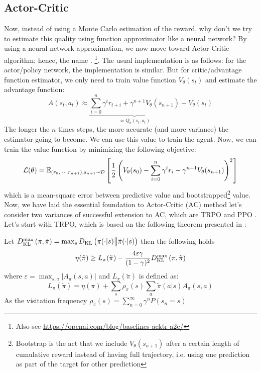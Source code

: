 \subsection{Actor-Critic}
\label{sec:chap2-ator-critic}
Now, instead of using a Monte Carlo estimation of the reward, why don't we try to estimate this quality using function approximator like a neural network? By using a neural network approximation, we now move toward Actor-Critic algorithm; hence, the name . \cite{mnih2016asynchronous}\footnote{Also see  \url{https://openai.com/blog/baselines-acktr-a2c/}}. The usual implementation is as follows: for the actor/policy network, the implementation is similar. But for critic/advantage function estimator, we only need to train value function $V_\theta(s_t)$  and estimate the advantage function:
\begin{equation}
    A(s_t, a_t) \approx \underbrace{\sum^n_{i=0} \gamma^i r_{t + i} + \gamma^{n+1} V_\theta(s_{n+1})}_{\approx Q_\theta(s_t, a_t)} - V_\theta(s_t)
\end{equation}
The longer the $n$ times steps, the more accurate (and more variance) the estimator going to become. We can use this value to train the agent. Now, we can train the value function by minimizing the following objective:
\begin{equation}
\label{eqn:chap2-ac-critic-loss}
    \mathcal{L}(\theta) = \mathbb{E}_{(r_0, \cdots, r_{n+1}), s_{n+1} \sim \mathcal{D}}\left[ \frac{1}{2}\left( V_\theta(s_0) - \sum^n_{i=0} \gamma^i r_i - \gamma^{n+1}V_\theta(s_{n+1}) \right)^2 \right]
\end{equation}
which is a mean-square error between predictive value and bootstrapped\footnote{Bootstrap is the act that we include $V_\theta(s_{n+1})$ after a certain length of cumulative reward instead of having full trajectory, i.e. using one prediction as part of the target for other prediction} value. Now, we have laid the essential foundation to Actor-Critic (AC) method let's consider two variances of successful extension to AC, which are TRPO \cite{schulman2015trust} and PPO \cite{schulman2017proximal}. Let's start with TRPO, which is based on the following theorem presented in \cite{schulman2015trust}:
\begin{theorem}
Let $D_{\mathrm{KL}}^{\max}\left( \pi, \tilde{\pi} \right) = \max_s D_{\mathrm{KL}}\left( \pi(\cdot | s) \big\| \tilde{\pi}(\cdot | s) \right)$  then the following holds
\begin{equation}
    \eta(\tilde{\pi}) \ge L_\pi(\tilde{\pi}) - \frac{4\varepsilon \gamma}{(1-\gamma)^2}D_{\mathrm{KL}}^{\max}\left( \pi, \tilde{\pi} \right)
\end{equation}
where $\varepsilon = \max_{s, a}|A_\pi(s, a)|$ and $L_\pi(\tilde{\pi})$ is defined as:
\begin{equation}
    L_\pi(\tilde{\pi}) = \eta(\pi) + \sum_s \rho_\pi(s) \sum_a \tilde{\pi}(a | s) A_\pi(s, a)
\end{equation}
As the visitation frequency $\rho_\pi(s) = \sum^\infty_{n=0} \gamma^n P(s_n = s)$
\end{theorem}
